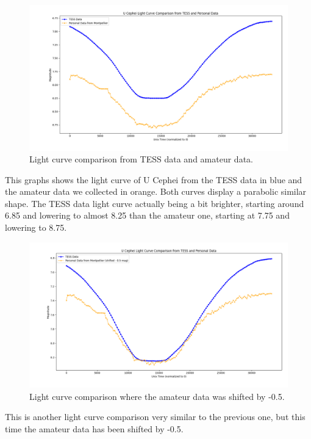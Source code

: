 \documentclass[12pt,a4paper]{article}
\begin{document}
\begin{figure}[H]
    \centering
    \includegraphics[width=1\textwidth]{assets/comparison.png}
    \caption{Light curve comparison from TESS data and amateur data.}
    \label{fig:tess-data-comparison}
\end{figure}

This graphs shows the light curve of U Cephei from the TESS data in blue and the amateur data we collected in orange. 
Both curves display a parabolic similar shape. The TESS data light curve actually being a bit brighter, starting around 6.85 and lowering to almost 8.25 than the amateur one, starting at 7.75 and lowering to 8.75.

\begin{figure}[H]
    \centering
    \includegraphics[width=1\textwidth]{assets/shifted-comparison.png}
    \caption{Light curve comparison where the amateur data was shifted by -0.5.}
  \label{fig:tess-data-comparison-shifted}
\end{figure}

This is another light curve comparison very similar to the previous one, but this time the amateur data has been shifted by -0.5. 
\end{document}
